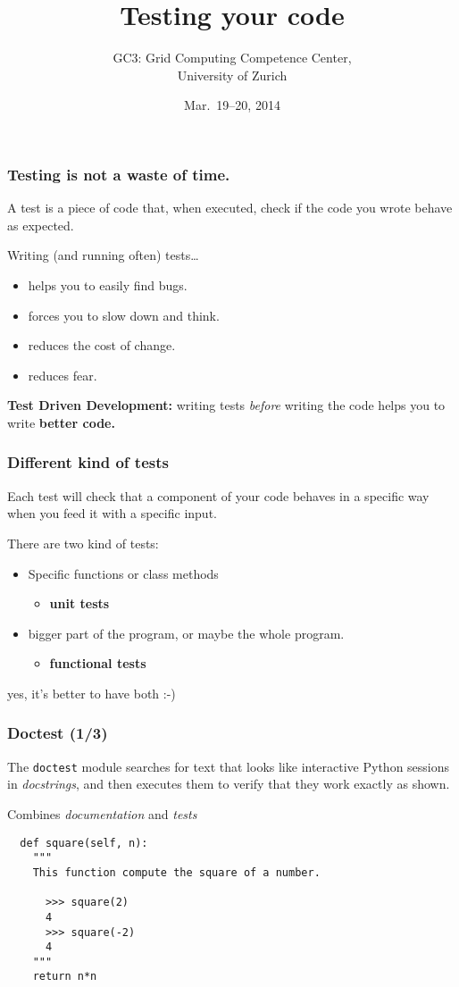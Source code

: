 \documentclass[english,serif,mathserif,xcolor=pdftex,dvipsnames,table]{beamer}
\title[Testing]{%
  Testing your code
}
\author[GC3]{%
  GC3: Grid Computing Competence Center, \\
  University of Zurich
}
\date{Mar.~19--20, 2014}
\begin{document}
\maketitle


\begin{frame}
  \frametitle{Testing is \textbf{not} a waste of time.}
  A test is a piece of code that, when executed, check if the code you
  wrote behave as expected.

  \+
  Writing (and running often) tests\ldots
  \begin{itemize}
  \item helps you to easily find bugs.
  \item forces you to slow down and think.
  \item reduces the cost of change.
  \item reduces fear.
  \end{itemize}

  \+ \textbf{Test Driven Development:} writing tests \textit{before}
  writing the code helps you to write \textbf{better code.}
\end{frame}


\begin{frame}
  \frametitle{Different kind of tests}

  Each test will check that a component of your code behaves in a
  specific way when you feed it with a specific input.

  \+
  There are two kind of tests:
  \begin{itemize}
  \item Specific functions or class methods
    \begin{itemize}
    \item \textbf{unit tests}
    \end{itemize}
  \item bigger part of the program, or maybe the whole program.
    \begin{itemize}
    \item \textbf{functional tests}
    \end{itemize}
  \end{itemize}

  \+
  \pause
  yes, it's better to have both :-)
\end{frame}


\begin{frame}[fragile]
  \frametitle{Doctest (1/3)}

  The \lstinline|doctest| module searches for text that looks like
  interactive Python sessions in \textit{docstrings}, and then
  executes them to verify that they work exactly as shown.

  \+
  Combines \textit{documentation} and \textit{tests}
  \begin{lstlisting}
  def square(self, n):
    """
    This function compute the square of a number.

      >>> square(2)
      4
      >>> square(-2)
      4
    """
    return n*n
  \end{lstlisting}
\end{frame}
\end{document}
